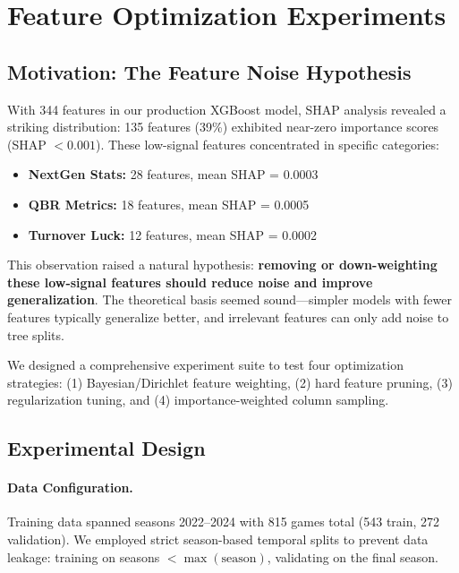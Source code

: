 
\section{Feature Optimization Experiments}
\label{sec:feature-optimization}

\subsection{Motivation: The Feature Noise Hypothesis}

With 344 features in our production XGBoost model, SHAP analysis revealed a striking distribution: 135 features (39\%) exhibited near-zero importance scores (SHAP $< 0.001$). These low-signal features concentrated in specific categories:

\begin{itemize}[itemsep=2pt,parsep=0pt]
    \item \textbf{NextGen Stats:} 28 features, mean SHAP = 0.0003
    \item \textbf{QBR Metrics:} 18 features, mean SHAP = 0.0005
    \item \textbf{Turnover Luck:} 12 features, mean SHAP = 0.0002
\end{itemize}

This observation raised a natural hypothesis: \textbf{removing or down-weighting these low-signal features should reduce noise and improve generalization}. The theoretical basis seemed sound---simpler models with fewer features typically generalize better, and irrelevant features can only add noise to tree splits.

We designed a comprehensive experiment suite to test four optimization strategies: (1) Bayesian/Dirichlet feature weighting, (2) hard feature pruning, (3) regularization tuning, and (4) importance-weighted column sampling.

\subsection{Experimental Design}

\paragraph{Data Configuration.}
Training data spanned seasons 2022--2024 with 815 games total (543 train, 272 validation). We employed strict season-based temporal splits to prevent data leakage: training on seasons $< \max(\text{season})$, validating on the final season.

